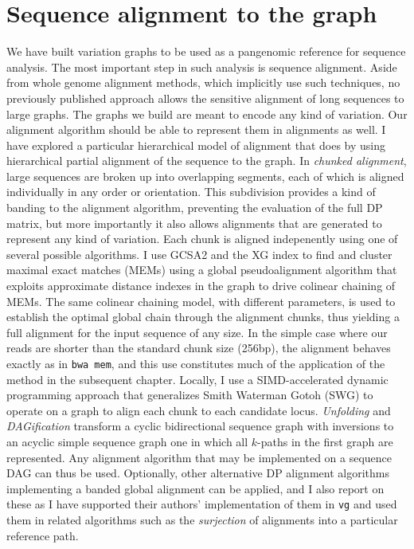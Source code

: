 \section{Sequence alignment to the graph}
We have built variation graphs to be used as a pangenomic reference for sequence analysis.
The most important step in such analysis is sequence alignment.
Aside from whole genome alignment methods, which implicitly use such techniques, no previously published approach allows the sensitive alignment of long sequences to large graphs.
The graphs we build are meant to encode any kind of variation.
Our alignment algorithm should be able to represent them in alignments as well.
I have explored a particular hierarchical model of alignment that does by using hierarchical partial alignment of the sequence to the graph.
In \emph{chunked alignment}, large sequences are broken up into overlapping segments, each of which is aligned individually in any order or orientation.
This subdivision provides a kind of banding to the alignment algorithm, preventing the evaluation of the full DP matrix, but more importantly it also allows alignments that are generated to represent any kind of variation.
Each chunk is aligned indepenently using one of several possible algorithms.
I use GCSA2 and the XG index to find and cluster maximal exact matches (MEMs) using a global pseudoalignment algorithm that exploits approximate distance indexes in the graph to drive colinear chaining of MEMs.
The same colinear chaining model, with different parameters, is used to establish the optimal global chain through the alignment chunks, thus yielding a full alignment for the input sequence of any size.
In the simple case where our reads are shorter than the standard chunk size (256bp), the alignment behaves exactly as in {\tt bwa mem}, and this use constitutes much of the application of the method in the subsequent chapter.
Locally, I use a SIMD-accelerated dynamic programming approach that generalizes Smith Waterman Gotoh (SWG) to operate on a graph to align each chunk to each candidate locus.
\emph{Unfolding} and \emph{DAGification} transform a cyclic bidirectional sequence graph with inversions to an acyclic simple sequence graph one in which all $k$-paths in the first graph are represented.
Any alignment algorithm that may be implemented on a sequence DAG can thus be used.
Optionally, other alternative DP alignment algorithms implementing a banded global alignment can be applied, and I also report on these as I have supported their authors' implementation of them in {\tt vg} and used them in related algorithms such as the \emph{surjection} of alignments into a particular reference path.

